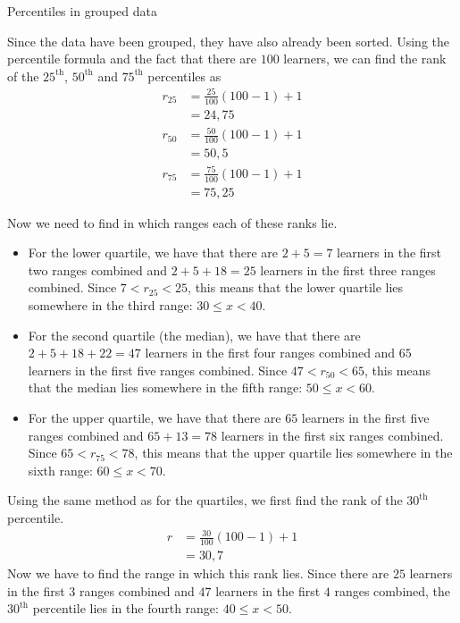 \begin{wex}{Percentiles in grouped data}
{  

  Since the data have been grouped, they have also already been
  sorted. Using the percentile formula and the fact that there are
  $100$ learners, we can find the rank of the $25^{\mathrm{th}}$, $50^{\mathrm{th}}$ and
  $75^{\mathrm{th}}$ percentiles as
  \begin{align*}
    r_{25} &= \frac{25}{100}\left(100-1\right)+1 \\
          &= 24,75 \\
    r_{50} &= \frac{50}{100}\left(100-1\right)+1 \\
          &= 50,5 \\
    r_{75} &= \frac{75}{100}\left(100-1\right)+1 \\
          &= 75,25
  \end{align*}

  Now we need to find in which ranges each of these ranks lie.
  \begin{itemize}
  \item For the lower quartile, we have that there are $2 + 5 = 7$
    learners in the first two ranges combined and $2 + 5 + 18 = 25$
    learners in the first three ranges combined. Since
    $7 < r_{25} < 25$,
    this means that the
    lower quartile lies somewhere in
    the third range: $30 \leq x < 40$.
  \item For the second quartile (the median), we have that there are
    $2 + 5 + 18 + 22 = 47$ learners in the first four ranges combined
    and $65$ learners in the first five ranges
    combined. Since $47 < r_{50} < 65$,
    this means that the median
    lies somewhere in the fifth range: $50 \leq x < 60$.
  \item For the upper quartile, we have that there are $65$ learners
    in the first five ranges combined and $65 + 13 = 78$ learners in
    the first six ranges combined. Since
    $65 < r_{75} < 78$,
    this means that the upper quartile
    lies somewhere in the sixth range: $60 \leq x < 70$.
  \end{itemize}


  Using the same method as for the quartiles, we first find the rank
  of the $30^{\mathrm{th}}$ percentile.
  \begin{align*}
    r &= \frac{30}{100}\left(100-1\right)+1 \\
      &= 30,7
  \end{align*}
  Now we have to find the range in which this rank lies. Since there
  are $25$ learners in the first $3$ ranges combined and $47$ learners
  in the first $4$ ranges combined, the $30^{\mathrm{th}}$ percentile lies in the
  fourth range: $40 \leq x < 50$.
}
\end{wex}

